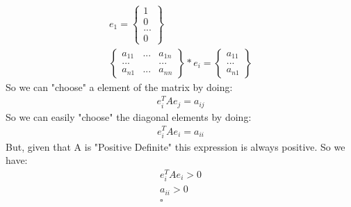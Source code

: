 \documentclass{article}
\begin{document}
	\begin{align*}
	e_1 = \begin{Bmatrix}1\\0\\...\\0\end{Bmatrix}\\
	\begin{Bmatrix}
	a_{11} & ... & a_{1n}\\
	... & & ...\\
	a_{n1} & ... & a_{nn}		
	\end{Bmatrix}*e_i = \begin{Bmatrix}a_{11} \\ ... \\ a_{n1} \end{Bmatrix}
	\end{align*}
	So we can "choose" a element of the matrix by doing:
	\begin{align*}
		e_i^TAe_j = a_{ij}
	\end{align*}
	So we can easily "choose" the diagonal elements by doing:
	\begin{align*}
	e_i^TAe_i = a_{ii}
	\end{align*}
	But, given that A is "Positive Definite" this expression is always positive.
	So we have:\\
	\begin{align*}
	e_i^TAe_i > 0\\
	a_{ii} > 0\\
	\square	
	\end{align*}
\end{document}
